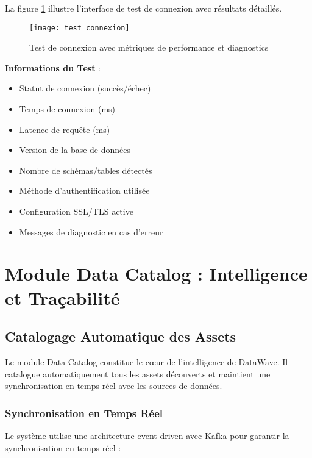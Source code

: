 La figure \ref{fig:test_connexion} illustre l'interface de test de connexion avec résultats détaillés.

\begin{figure}[htpb]
\centering
\texttt{[image: test\_connexion]}
\caption{Test de connexion avec métriques de performance et diagnostics}
\label{fig:test_connexion}
\end{figure}

\textbf{Informations du Test} :
\begin{itemize}
    \item Statut de connexion (succès/échec)
    \item Temps de connexion (ms)
    \item Latence de requête (ms)
    \item Version de la base de données
    \item Nombre de schémas/tables détectés
    \item Méthode d'authentification utilisée
    \item Configuration SSL/TLS active
    \item Messages de diagnostic en cas d'erreur
\end{itemize}

\section{Module Data Catalog : Intelligence et Traçabilité}

\subsection{Catalogage Automatique des Assets}

Le module Data Catalog constitue le cœur de l'intelligence de DataWave. Il catalogue automatiquement tous les assets découverts et maintient une synchronisation en temps réel avec les sources de données.

\subsubsection{Synchronisation en Temps Réel}

Le système utilise une architecture event-driven avec Kafka pour garantir la synchronisation en temps réel :

